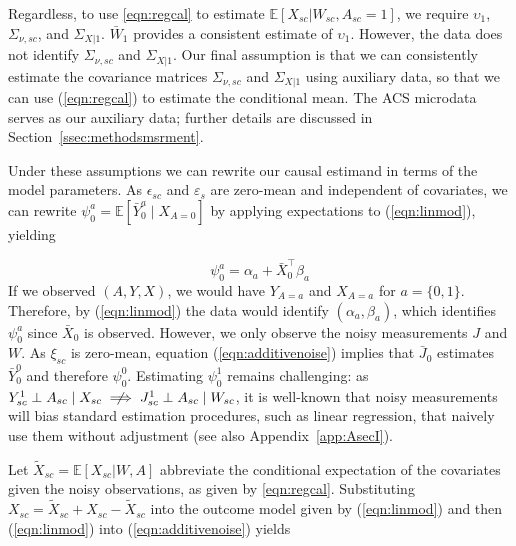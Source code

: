 \documentclass[aoas]{imsart}
\theoremstyle{plain}
\theoremstyle{remark}
\begin{document}
Regardless, to use \eqref{eqn:regcal} to estimate $\mathbb{E}[X_{sc}|W_{sc}, A_{sc}=1]$, we require $\upsilon_1$, $\Sigma_{\nu,sc}$, and $\Sigma_{X|1}$. $\bar{W}_1$ provides a consistent estimate of $\upsilon_1$. However, the data does not identify $\Sigma_{\nu,sc}$ and $\Sigma_{X|1}$. Our final assumption is that we can consistently estimate the covariance matrices $\Sigma_{\nu,sc}$ and $\Sigma_{X|1}$ using auxiliary data, so that we can use (\ref{eqn:regcal}) to estimate the conditional mean. The ACS microdata serves as our auxiliary data; further details are discussed in Section~\ref{ssec:methodsmsrment}.

Under these assumptions we can rewrite our causal estimand in terms of the model parameters. As $\epsilon_{sc}$ and $\varepsilon_s$ are zero-mean and independent of covariates,  we can rewrite $\psi_0^a = \mathbb{E}[\bar{Y}_0^a \mid X_{A=0}]$ by applying expectations to (\ref{eqn:linmod}), yielding

\begin{equation}\label{eqn:outcome}
\psi_0^a = \alpha_a + \bar{X}_0^\top\beta_a
\end{equation}
If we observed $(A,Y,X)$, we would have $Y_{A=a}$ and $X_{A=a}$ for $a=\{0,1\}$. Therefore, by (\ref{eqn:linmod}) the data would identify $(\alpha_a, \beta_a)$, which identifies $\psi_0^a$ since $\bar{X}_0$ is observed. However, we only observe the noisy measurements $J$ and $W$. As $\xi_{sc}$ is zero-mean, equation (\ref{eqn:additivenoise}) implies that $\bar{J}_0$ estimates $\bar{Y}_0^0$ and therefore $\psi_0^0$. Estimating $\psi_0^1$ remains challenging: as $Y_{sc}^1 \perp A_{sc} \mid X_{sc} \centernot\implies J_{sc}^1 \perp A_{sc} \mid W_{sc}$, it is well-known that noisy measurements will bias standard estimation procedures, such as linear regression, that naively use them without adjustment (see also Appendix~\ref{app:AsecI}).

Let $\tilde{X}_{sc} = \mathbb{E}[X_{sc} |W, A]$ abbreviate the conditional expectation of the covariates given the noisy observations, as given by \eqref{eqn:regcal}. Substituting $X_{sc} = \tilde{X}_{sc} + X_{sc} - \tilde{X}_{sc}$ into the outcome model given by (\ref{eqn:linmod}) and then (\ref{eqn:linmod}) into (\ref{eqn:additivenoise}) yields
\end{document}
